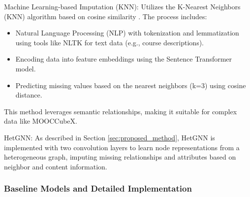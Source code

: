 \documentclass{ieeeaccess}
\begin{document}
Machine Learning-based Imputation (KNN): Utilizes the K-Nearest Neighbors (KNN) algorithm based on cosine similarity \cite{troyanskaya2001missingDNA}. The process includes:
        \begin{itemize}
            \item Natural Language Processing (NLP) with tokenization and lemmatization using tools like NLTK for text data (e.g., course descriptions).
            \item Encoding data into feature embeddings using the Sentence Transformer model.
            \item Predicting missing values based on the nearest neighbors (k=3) using cosine distance.
        \end{itemize}
        This method leverages semantic relationships, making it suitable for complex data like MOOCCubeX.
        
HetGNN: As described in Section \ref{sec:proposed_method}, HetGNN is implemented with two convolution layers to learn node representations from a heterogeneous graph, imputing missing relationships and attributes based on neighbor and content information.

\subsubsection{Baseline Models and Detailed Implementation}
\end{document}
